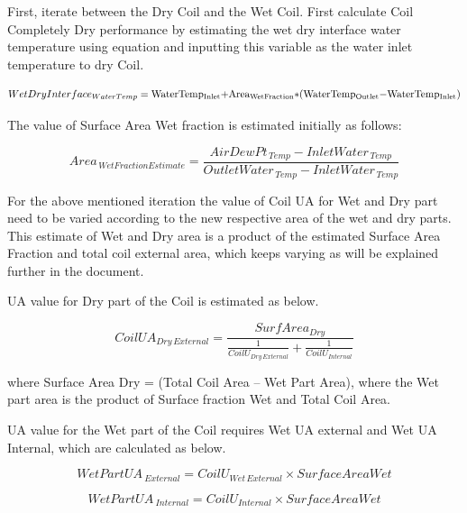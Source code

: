 First, iterate between the Dry Coil and the Wet Coil. First calculate Coil Completely Dry performance by estimating the wet dry interface water temperature using equation and inputting this variable as the water inlet temperature to dry Coil.

\begin{equation}
  WetDryInterfac{e_{WaterTemp}} = {\rm{WaterTem}}{{\rm{p}}_{{\rm{Inlet}}}}{\rm{ + Are}}{{\rm{a}}_{{\rm{WetFraction}}}}{\rm{*(WaterTem}}{{\rm{p}}_{{\rm{Outlet}}}}{\rm{ - WaterTem}}{{\rm{p}}_{{\rm{Inlet}}}}{\rm{)}}
\end{equation}

The value of Surface Area Wet fraction is estimated initially as follows:

\begin{equation}
Are{a_{\,WetFractionEstimate}} = \frac{{AirDewP{t_{\,Temp}} - InletWate{r_{\,Temp}}}}{{OutletWate{r_{\,Temp}} - InletWate{r_{\,Temp}}}}
\label{eq:AreaWetFractionEstimate}
\end{equation}

For the above mentioned iteration the value of Coil UA for Wet and Dry part need to be varied according to the new respective area of the wet and dry parts. This estimate of Wet and Dry area is a product of the estimated Surface Area Fraction and total coil external area, which keeps varying as will be explained further in the document.

UA value for Dry part of the Coil is estimated as below.

\begin{equation}
CoilU{A_{Dry\,External}} = \frac{{SurfAre{a_{Dry}}}}{{\frac{1}{{Coil{U_{Dry\,External}}}} + \frac{1}{{Coil{U_{Internal}}}}}}
\end{equation}

where Surface Area Dry = (Total Coil Area -- Wet Part Area), where the Wet part area is the product of Surface fraction Wet and Total Coil Area.

UA value for the Wet part of the Coil requires Wet UA external and Wet UA Internal, which are calculated as below.

\begin{equation}
WetPartUA{\,_{External}} = Coil{U_{Wet\,External}} \times SurfaceAreaWet
\end{equation}

\begin{equation}
WetPartUA{\,_{Internal}} = Coil{U_{Internal}} \times SurfaceAreaWet
\end{equation}

